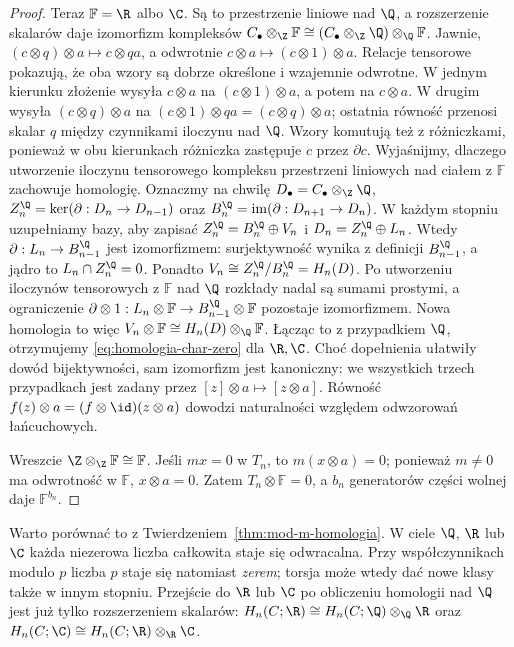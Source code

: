 \begin{proof}
Teraz $\mathbb F=\R$ albo $\C$.
Są to przestrzenie liniowe nad $\Q$, a
rozszerzenie skalarów daje izomorfizm
kompleksów $C_\bullet\otimes_{\Z}\mathbb F
\cong (C_\bullet\otimes_{\Z}\Q)\otimes_{\Q}\mathbb F$.
Jawnie, $(c\otimes q)\otimes a\mapsto c\otimes qa$,
a odwrotnie $c\otimes a\mapsto(c\otimes1)\otimes a$.
Relacje tensorowe pokazują, że oba wzory są dobrze określone
i wzajemnie odwrotne. W jednym kierunku złożenie wysyła
$c\otimes a$ na $(c\otimes1)\otimes a$, a potem na $c\otimes a$.
W drugim wysyła $(c\otimes q)\otimes a$
na $(c\otimes1)\otimes qa=(c\otimes q)\otimes a$;
ostatnia równość przenosi skalar $q$ między czynnikami
iloczynu nad $\Q$. Wzory komutują też z różniczkami,
ponieważ w obu kierunkach różniczka zastępuje $c$ przez $\partial c$.
Wyjaśnijmy, dlaczego utworzenie iloczynu tensorowego kompleksu
przestrzeni liniowych nad ciałem z $\mathbb F$ zachowuje
homologię. Oznaczmy na chwilę
$D_\bullet=C_\bullet\otimes_{\Z}\Q$,
$Z_n^\Q=\ker(\partial:D_n\to D_{n-1})$
oraz $B_n^\Q=\operatorname{im}(\partial:D_{n+1}\to D_n)$.
W każdym stopniu uzupełniamy bazy, aby zapisać
$Z_n^\Q=B_n^\Q\oplus V_n$ i
$D_n=Z_n^\Q\oplus L_n$.
Wtedy $\partial:L_n\to B_{n-1}^\Q$ jest
izomorfizmem: surjektywność wynika z definicji
$B_{n-1}^\Q$, a jądro to
$L_n\cap Z_n^\Q=0$. Ponadto
$V_n\cong Z_n^\Q/B_n^\Q=H_n(D)$.
Po utworzeniu iloczynów tensorowych z $\mathbb F$ nad $\Q$ rozkłady nadal
są sumami prostymi, a ograniczenie
$\partial\otimes1:L_n\otimes\mathbb F
\to B_{n-1}^\Q\otimes\mathbb F$ pozostaje
izomorfizmem. Nowa homologia to więc
$V_n\otimes\mathbb F
\cong H_n(D)\otimes_{\Q}\mathbb F$.
Łącząc to z przypadkiem $\Q$, otrzymujemy
\eqref{eq:homologia-char-zero} dla $\R,\C$.
Choć dopełnienia ułatwiły dowód bijektywności, sam izomorfizm
jest kanoniczny: we wszystkich trzech przypadkach jest zadany
przez $[z]\otimes a\mapsto[z\otimes a]$.
Równość $f(z)\otimes a=(f\otimes\id)(z\otimes a)$ dowodzi
naturalności względem odwzorowań łańcuchowych.

Wreszcie $\Z\otimes_{\Z}\mathbb F\cong\mathbb F$.
Jeśli $mx=0$ w $T_n$, to
$m(x\otimes a)=0$; ponieważ $m\ne0$
ma odwrotność w $\mathbb F$,
$x\otimes a=0$. Zatem $T_n\otimes\mathbb F=0$,
a $b_n$ generatorów części wolnej daje
$\mathbb F^{b_n}$.
\end{proof}

Warto porównać to z Twierdzeniem~\ref{thm:mod-m-homologia}.
W ciele $\Q$, $\R$ lub $\C$ każda niezerowa
liczba całkowita staje się odwracalna.
Przy współczynnikach modulo $p$ liczba $p$
staje się natomiast \emph{zerem}; torsja
może wtedy dać nowe klasy także w innym stopniu.
Przejście do $\R$ lub $\C$ po obliczeniu
homologii nad $\Q$ jest już tylko
rozszerzeniem skalarów: $H_n(C;\R)\cong H_n(C;\Q)\otimes_{\Q}\R$
oraz $H_n(C;\C)\cong H_n(C;\R)\otimes_{\R}\C$.

